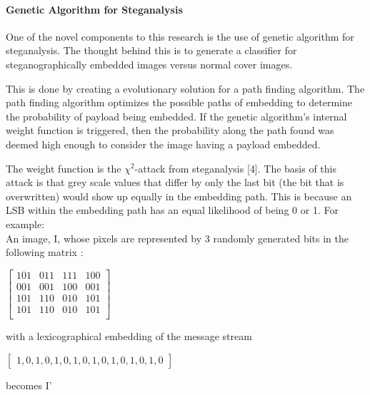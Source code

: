\documentclass[12pt]{article}
\begin{document}
\paragraph{Genetic Algorithm for Steganalysis}
\par One of the novel components to this research is the use of genetic algorithm for steganalysis. The thought behind this is to generate a classifier for steganographically embedded images versus normal cover images.
\par This is done by creating a evolutionary solution for a path finding algorithm. The path finding algorithm optimizes the possible paths of embedding to determine the probability of payload being embedded. If the genetic algorithm's internal weight function is triggered, then the probability along the path found was deemed high enough to consider the image having a payload embedded.
\par The weight function is the $\chi ^ 2$-attack from steganalysis [4]. The basis of this attack is that grey scale values that differ by only the last bit (the bit that is overwritten) would show up equally in the embedding path. This is because an LSB within the embedding path has an equal likelihood of being 0 or 1.
For example: \\
An image, I, whose pixels are represented by 3 randomly generated bits in the following matrix : 
\begin{center}
$  \left[ \begin{array}{cccc} 
 101 & 011 & 111 & 100\\
  001 & 001 & 100 & 001\\
 101 & 110 & 010 & 101 \\
 101 & 110 & 010 & 101 \\  \end{array} \right] $ 
\end{center}
with a lexicographical embedding of the message stream 
\begin{center}
$ \left[ \begin{array}{c} 1,  0 , 1,  0,  1,  0,  1,  0,  1,  0,  1,  0,  1,  0,  1,  0 \end{array} \right] $
\end{center}
becomes I'
\end{document}
